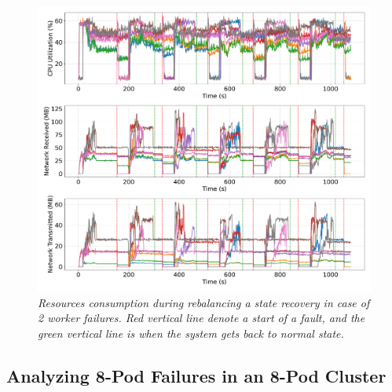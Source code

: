 \begin{figure}[H]
    \centering
    \includegraphics[width=1\textwidth]{figures/kstreams-2pods/kafka_2_pods_resources}
    \caption{\textit{Resources consumption during rebalancing a state recovery in case of 2 worker failures.
    Red vertical line denote a start of a fault, and the green vertical line is when the system gets back to normal
    state.}}
    \label{fig:kafka-2pods-resource}
\end{figure}


\newpage
\subsection{Analyzing 8-Pod Failures in an 8-Pod Cluster}\label{subsec:analyzing-8-pod-failures-in-an-8-pod-cluster}

